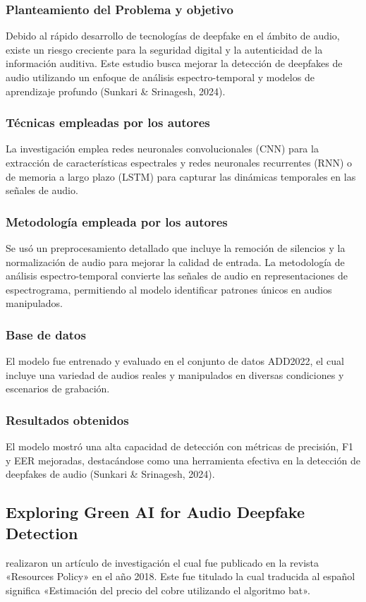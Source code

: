 \subsubsection{Planteamiento del Problema y objetivo }
Debido al rápido desarrollo de tecnologías de deepfake en el ámbito de audio, existe un riesgo creciente para la seguridad digital y la autenticidad de la información auditiva. Este estudio busca mejorar la detección de deepfakes de audio utilizando un enfoque de análisis espectro-temporal y modelos de aprendizaje profundo (Sunkari \& Srinagesh, 2024).

\subsubsection{Técnicas empleadas por los autores}
La investigación emplea redes neuronales convolucionales (CNN) para la extracción de características espectrales y redes neuronales recurrentes (RNN) o de memoria a largo plazo (LSTM) para capturar las dinámicas temporales en las señales de audio.

\subsubsection{Metodología empleada por los autores}
Se usó un preprocesamiento detallado que incluye la remoción de silencios y la normalización de audio para mejorar la calidad de entrada. La metodología de análisis espectro-temporal convierte las señales de audio en representaciones de espectrograma, permitiendo al modelo identificar patrones únicos en audios manipulados.

\subsubsection{Base de datos}
El modelo fue entrenado y evaluado en el conjunto de datos ADD2022, el cual incluye una variedad de audios reales y manipulados en diversas condiciones y escenarios de grabación.

\subsubsection{Resultados obtenidos}
El modelo mostró una alta capacidad de detección con métricas de precisión, F1 y EER mejoradas, destacándose como una herramienta efectiva en la detección de deepfakes de audio (Sunkari \& Srinagesh, 2024).

\subsection{Exploring Green AI for Audio Deepfake Detection \citep*{pr_dehghani2018copper}}
\citeauthor{pr_dehghani2018copper} realizaron un artículo de investigación el cual fue publicado en la revista «Resources Policy» en el año 2018. Este fue titulado  la cual traducida al español significa «Estimación del precio del cobre utilizando el algoritmo bat».

